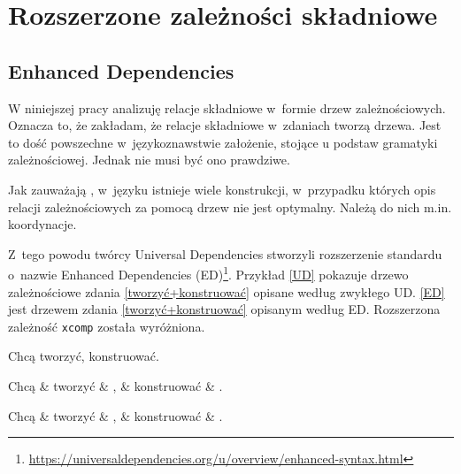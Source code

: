 \chapter{Rozszerzone zależności składniowe}

\section{Enhanced Dependencies}

W niniejszej pracy analizuję relacje składniowe w~formie drzew zależnościowych. Oznacza to, że zakładam, że relacje składniowe w~zdaniach tworzą drzewa. Jest to dość powszechne w~językoznawstwie założenie, stojące u podstaw gramatyki zależnościowej. Jednak nie musi być ono prawdziwe. 

Jak zauważają \cite{de2021universal}, w~języku istnieje wiele konstrukcji, w~przypadku których opis relacji zależnościowych za pomocą drzew nie jest optymalny. Należą do nich m.in. koordynacje.

Z~tego powodu twórcy Universal Dependencies stworzyli rozszerzenie standardu o~nazwie Enhanced Dependencies (ED)\footnote{\url{https://universaldependencies.org/u/overview/enhanced-syntax.html}}. Przykład \eqref{UD} pokazuje drzewo zależnościowe zdania \eqref{tworzyć+konstruować} opisane według zwykłego UD. \eqref{ED} jest drzewem zdania \eqref{tworzyć+konstruować} opisanym według ED. Rozszerzona zależność \texttt{xcomp} została wyróżniona.

\begin{exe}
\ex \label{tworzyć+konstruować}
Chcą tworzyć, konstruować.
 
\ex \label{UD}
\begin{dependency}[baseline=-\the\dimexpr\fontdimen22\textfont2\relax]
\begin{deptext}[column sep=1em]
Chcą \& tworzyć \& , \& konstruować \& .  \\ 
\end{deptext}
\end{dependency}

\ex \label{ED}
\begin{dependency}[baseline=-\the\dimexpr\fontdimen22\textfont2\relax]
\begin{deptext}[column sep=1em]
Chcą \& tworzyć \& , \& konstruować \& .  \\ 
\end{deptext}
\end{dependency}
\citep{przepiorkowski2018lexical}
\end{exe}


